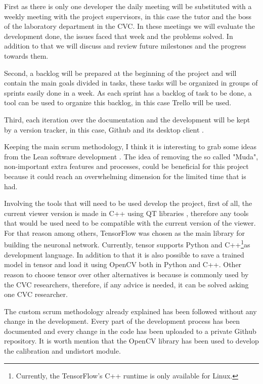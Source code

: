 \documentclass[10pt,a4paper,twocolumn,twoside]{article}
\begin{document}
	First as there is only one developer the daily meeting will be substituted with a weekly meeting with the project supervisors, in this case the tutor and the boss of the laboratory department in the CVC. In these meetings we will evaluate the development done, the issues faced that week and the problems solved. In addition to that we will discuss and review future milestones and the progress towards them.
	
	Second, a backlog will be prepared at the beginning of the project and will contain the main goals divided in tasks, these tasks will be organized in groups of sprints easily done in a week. As each sprint has a backlog of task to be done, a tool can be used to organize this backlog, in this case Trello\cite{web:trello} will be used.
	
	Third, each iteration over the documentation and the development will be kept by a version tracker, in this case, Github \cite{web:github} and its desktop client \cite{web:githubDesktop}. 
	
	Keeping the main scrum methodology, I think it is interesting to grab some ideas from the Lean software development \cite{web:leanMethod}. The idea of removing the so called "Muda", non-important extra features and processes, could be beneficial for this project because it could reach an overwhelming dimension for the limited time that is had.
	
	Involving the tools that will need to be used develop the project, first of all, the current viewer version is made in C++ using QT libraries \cite{web:qt}, therefore any tools that would be used need to be compatible with the current version of the viewer. For that reason among others, TensorFlow\cite{web:tensor} was chosen as the main library for building the neuronal network. Currently, tensor supports  Python and C++\footnote{Currently, the TensorFlow's C++ runtime is only available for Linux.}as development language. In addition to that it is also possible to save a trained model in tensor and load it using OpenCV both in Python and C++. Other reason to choose tensor over other alternatives is because is commonly used by the CVC researchers, therefore, if any advice is needed, it can be solved asking one CVC researcher.
	
	The custom scrum methodology already explained has been followed without any change in the development. Every part of the development process has been documented and every change in the code has been uploaded to a private Github repository. It is worth mention that the OpenCV \cite{web:opencv} library has been used to develop the calibration and undistort module. 
	
\end{document}
